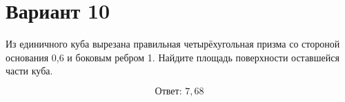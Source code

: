 \documentclass[12pt,a4paper]{article}
\begin{document}
\section*{Вариант 10}

Из единичного куба вырезана правильная четырёхугольная призма со стороной основания 0{,}6 и боковым ребром 1. Найдите площадь поверхности оставшейся части куба.

\begin{center}
\end{center}

\[
\boxed{\text{Ответ: }7{,}68}
\]
\end{document}
